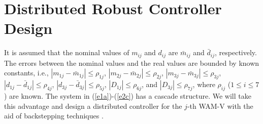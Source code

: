\documentclass[letterpaper, 10 pt, conference]{ieeeconf}  %
\newtheorem{lemma}{Lemma}
\begin{document}
%

\section{Distributed Robust Controller Design}
\label{sec4}

 It is assumed that the nominal values of $m_{ij}$ and $d_{ij}$ are $\bar{m}_{ij}$ and $\bar{d}_{ij}$, respectively. The errors between the nominal values and the real values are bounded by known constants, i.e.,
$|m_{1j}-\bar{m}_{1j}|\leq \rho_{1j}$, $|m_{2j}-\bar{m}_{2j}|\leq \rho_{2j}$, $|m_{3j}-\bar{m}_{3j}|\leq \rho_{3j}$,
$|d_{1j}-\bar{d}_{1j}|\leq \rho_{4j}$, $|d_{3j}-\bar{d}_{3j}|\leq \rho_{5j}$,  $\left|D_{1j}\right|\leq \rho_{6j}$, and
$\left|D_{3j}\right|\leq \rho_{7j}$, 
where $\rho_{ij}$ ($1\leq i\leq 7$) are known.
The system in (\ref{e1a})-(\ref{e2c}) has a cascade structure. We will take this advantage and design a  distributed controller for the $j$-th WAM-V with the aid of backstepping techniques \cite{krs95}. 
\end{document}
